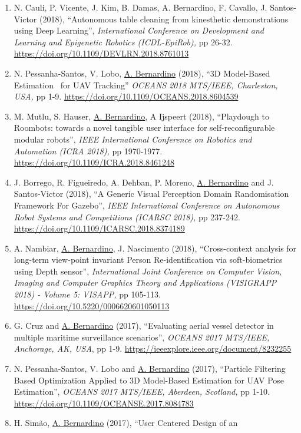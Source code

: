 \begin{enumerate}
  \url{https://doi.org/10.1109/DEVLRN.2018.8761022}~
\item
  N. Cauli, P. Vicente, J. Kim, B. Damas, A. Bernardino, F. Cavallo, J.
  Santos-Victor (2018), ``Autonomous table cleaning from kinesthetic
  demonstrations using Deep Learning'', \emph{International Conference
  on Development and Learning and Epigenetic Robotics (ICDL-EpiRob),} pp
  26-32. \url{https://doi.org/10.1109/DEVLRN.2018.8761013}~
\item
  N. Pessanha-Santos, V. Lobo, \ul{A. Bernardino} (2018), ``3D
  Model-Based Estimation~ for UAV Tracking'' \emph{OCEANS 2018 MTS/IEEE,
  Charleston, USA,} pp 1-9.
  \url{https://doi.org/10.1109/OCEANS.2018.8604539}~
\item
  M. Mutlu, S. Hauser, \ul{A. Bernardino}, A Ijspeert (2018),
  ``Playdough to Roombots: towards a novel tangible user interface for
  self-reconfigurable modular robots'', \emph{IEEE International
  Conference on Robotics and Automation (ICRA 2018),} pp 1970-1977.
  \url{https://doi.org/10.1109/ICRA.2018.8461248}~~
\item
  J. Borrego, R. Figueiredo, A. Dehban, P. Moreno, \ul{A. Bernardino}
  and J. Santos-Victor (2018), ``A Generic Visual Perception Domain
  Randomisation Framework For Gazebo'', \emph{IEEE International
  Conference on Autonomous Robot Systems and Competitions (ICARSC
  2018),} pp 237-242. \url{https://doi.org/10.1109/ICARSC.2018.8374189}~
\item
  A. Nambiar, \ul{A. Bernardino}, J. Nascimento (2018), ``Cross-context
  analysis for long-term view-point invariant Person Re-identification
  via soft-biometrics using Depth sensor'', \emph{International Joint
  Conference on Computer Vision, Imaging and Computer Graphics Theory
  and Applications (VISIGRAPP 2018) - Volume 5: VISAPP,} pp 105-113.
  \url{https://doi.org/10.5220/0006620601050113}~
\item
  G. Cruz and \ul{A. Bernardino} (2017), ``Evaluating aerial vessel
  detector in multiple maritime surveillance scenarios'', \emph{OCEANS
  2017 MTS/IEEE, Anchorage, AK, USA}, pp 1-9.
  \url{https://ieeexplore.ieee.org/document/8232255}~
\item
  N. Pessanha-Santos, V. Lobo and \ul{A. Bernardino} (2017), ``Particle
  Filtering Based Optimization Applied to 3D Model-Based Estimation for
  UAV Pose Estimation'', \emph{OCEANS 2017 MTS/IEEE, Aberdeen,
  Scotland,} pp 1-10.
  \url{https://doi.org/10.1109/OCEANSE.2017.8084783}~
\item
  H. Simão, \ul{A. Bernardino} (2017), ``User Centered Design of an

\end{enumerate}
